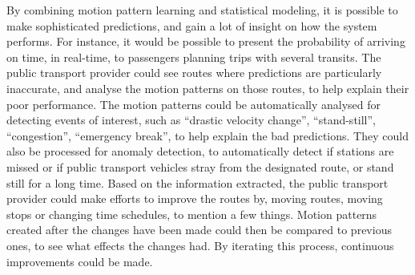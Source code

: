 By combining motion pattern learning and statistical modeling,
it is possible to make sophisticated predictions, and gain a lot of
insight on how the system performs. For instance, it would be
possible to present the probability of arriving on time, in
real-time, to passengers planning trips with several transits.
The public transport provider could see routes where
predictions are particularly inaccurate, and analyse the motion
patterns on those routes, to help explain their poor performance. 
The motion patterns could be automatically analysed for
detecting events of interest, such as ``drastic velocity change'', 
``stand-still'', ``congestion'', ``emergency break'', to help explain the
bad predictions. They could also be processed for anomaly
detection, to automatically detect if stations are missed or if public
transport vehicles stray from the designated route, or stand still for
a long time.
Based on the information extracted, the public transport provider
could make efforts to improve the routes by, moving routes, moving stops or changing
time schedules, to mention a few things. Motion patterns created after the changes have been
made could then be compared to previous ones, to see what effects
the changes had. By iterating this process, continuous improvements
could be made.





